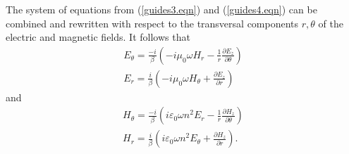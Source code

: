 \documentclass[12pt]{article}
\theoremstyle{definition}
\numberwithin{equation}{section}
\begin{document}
{The system of equations from (\ref{guides3.eqn}) and (\ref{guides4.eqn}) can be combined and rewritten with respect to the transversal components $r,\theta$ of the electric and magnetic fields. It follows that
\begin{gather*}
E_{\theta}=\frac{-i}{\beta}\left(-i\mu_{0}\omega H_r -\frac{1}{r}\frac{\partial E_z}{\partial\theta}\right)\\
E_{r}=\frac{i}{\beta}\left(-i\mu_{0}\omega H_{\theta} + \frac{\partial E_z}{\partial r}\right)
\end{gather*}
and
\begin{gather*}
H_{\theta}=\frac{-i}{\beta}\left(i\varepsilon_{0}\omega n^2 E_r - \frac{1}{r}\frac{\partial H_z}{\partial\theta}\right)\\
H_{r}=\frac{i}{\beta}\left(i\varepsilon_{0}\omega n^2 E_{\theta} + \frac{\partial H_z}{\partial r}\right).
\end{gather*}

}
\end{document}
